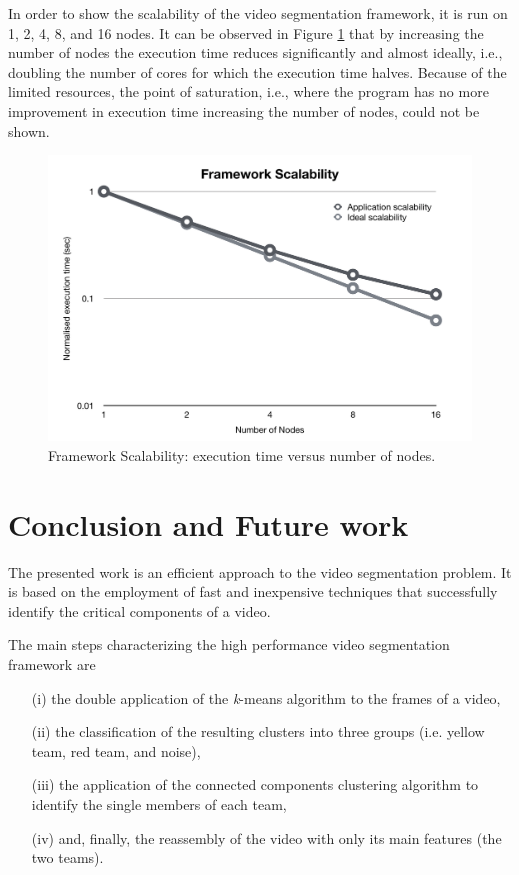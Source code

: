 \documentclass{usiinftr}
\begin{document}
In order to show the scalability of the video segmentation framework, it is run on 1, 2, 4, 8, and 16 nodes. It can be observed in Figure \ref{fig:9} that by increasing the number of nodes the execution time reduces significantly and almost ideally, i.e., doubling the number of cores for which the execution time halves. Because of the limited resources, the point of saturation, i.e., where the program has no more improvement in execution time increasing the number of nodes, could not be shown.

\begin{figure}[h]
	\centering
	\includegraphics[width=0.8\linewidth]{img/scalability}
	\caption{Framework Scalability: execution time versus number of nodes.}
	\label{fig:9}
\end{figure}

\section{Conclusion and Future work }
The presented work is an efficient approach to the video segmentation problem. It is based on the employment of fast and inexpensive techniques that successfully identify the critical components of a video.

The main steps characterizing the high performance video segmentation framework are 
\begin{itemize}
	\item[(i)] the double application of the \textit{k}-means algorithm to the frames of a video, 
	\item[(ii)] the classification of the resulting clusters into three groups (i.e. yellow team, red team, and noise), 
	\item[(iii)] the application of the connected components clustering algorithm to identify the single members of each team,
	\item[(iv)] and, finally, the reassembly of the video with only its main features (the two teams).
\end{itemize}
\end{document}
